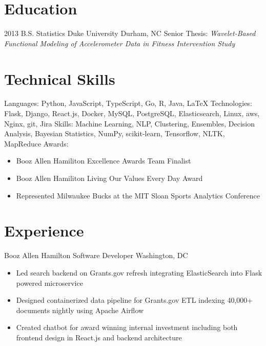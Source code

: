 \documentclass[11pt,a4paper,sans]{moderncv}        %
\begin{document}
\makecvtitle
\vspace{-6ex}                                      %

\section{Education}
\cventry
	{2013}
	{B.S. Statistics}
	{Duke University}
	{Durham, NC}
	{}
	{Senior Thesis: \textit{Wavelet-Based Functional Modeling of Accelerometer Data in Fitness Intervention Study}}

\section{Technical Skills}
\cvitem
  {Languages:}
  {Python, JavaScript, TypeScript, Go, R, Java, \LaTeX}
\cvitem
  {Technologies:}
  {Flask, Django, React.js, Docker, MySQL, PostgreSQL, Elasticsearch, Linux, aws, Nginx, git, Jira}
\cvitem
  {Skills:}
  {Machine Learning, NLP, Clustering, Ensembles, Decision Analysis, Bayesian Statistics, NumPy, scikit-learn, Tensorflow, NLTK, MapReduce}
\cvitem
  {Awards:}
  {
    \begin{itemize}
		\item{Booz Allen Hamiliton Excellence Awards Team Finalist}
		\item{Booz Allen Hamiliton Living Our Values Every Day Award}
		\item{Represented Milwaukee Bucks at the MIT Sloan Sports Analytics Conference}
    \end{itemize}
  }

\vspace{-3ex}
\section{Experience}
  {Booz Allen Hamilton Software Developer}
  {}
  {Washington, DC}
  {}
  {
    \begin{itemize}
		\item{Led search backend on Grants.gov refresh integrating ElasticSearch into Flask powered microservice}
 		\item{Designed containerized data pipeline for Grants.gov ETL indexing 40,000+ documents nightly using Apache Airflow}
		\item{Created chatbot for award winning internal investment including both frontend design in React.js and backend architecture}
    \end{itemize}
  }
\end{document}
